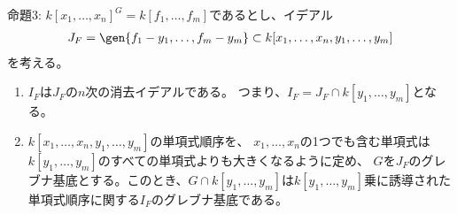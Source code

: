 \begin{framed}
  命題3:
  $k[x_1,\dots,x_n]^G = k[f_1,\dots,f_m]$であるとし、イデアル
  \begin{align}
    J_F = \gen{f_1-y_1,\dots,f_m-y_m} \subset k[x_1,\dots,x_n,y_1,\dots,y_m]
  \end{align}
  を考える。
  \begin{enumerate}[label=(\roman*)]
    \item $I_F$は$J_F$の$n$次の消去イデアルである。
    つまり、$I_F = J_F \cap k[y_1,\dots,y_m]$となる。
    \item
    $k[x_1,\dots,x_n,y_1,\dots,y_m]$の単項式順序を、
    $x_1,\dots,x_n$の1つでも含む単項式は$k[y_1,\dots,y_m]$のすべての単項式よりも大きくなるように定め、
    $G$を$J_F$のグレブナ基底とする。このとき、$G\cap k[y_1,\dots,y_m]$は$k[y_1,\dots,y_m]$乗に誘導された
    単項式順序に関する$I_F$のグレブナ基底である。
  \end{enumerate}
\end{framed}
